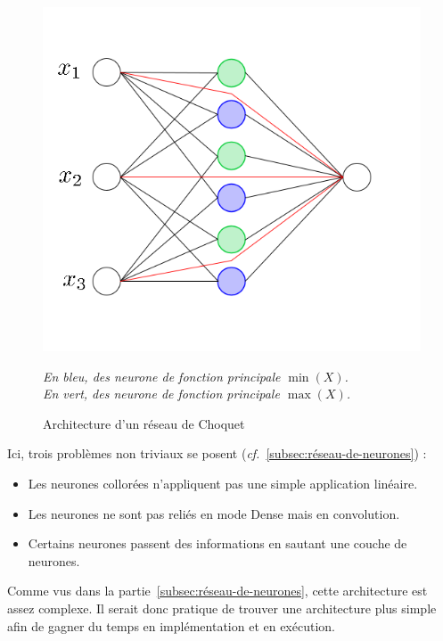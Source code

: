 \begin{figure}[H]
    \center
    \includegraphics[height=\moyen]{pict/chnet1}
	\caption{Architecture d'un réseau de Choquet}
	\label{fig:chnet1}
    \vspace{-10pt}
    \begin{center}
        \footnotesize
        \textit{
        En bleu, des neurone de fonction principale $\min(X)$. \\
        En vert, des neurone de fonction principale $\max(X)$.
        }
    \end{center}
\end{figure}
\vspace{-12pt}
Ici, trois problèmes non triviaux se posent (\textit{cf.}\ \ref{subsec:réseau-de-neurones}) :
\begin{itemize}
    \item Les neurones collorées n'appliquent pas une simple application linéaire.
    \item Les neurones ne sont pas reliés en mode Dense mais en convolution.
    \item Certains neurones passent des informations en sautant une couche de neurones.
\end{itemize}
Comme vus dans la partie\ \ref{subsec:réseau-de-neurones}, cette architecture est assez complexe.
Il serait donc pratique de trouver une architecture plus simple afin de gagner du temps en implémentation et en exécution.


